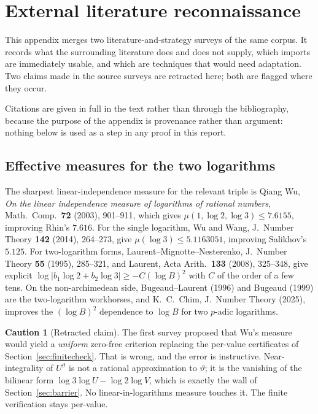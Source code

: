 \documentclass[11pt,oneside]{article}
\theoremstyle{definition}
\newtheorem{warning}[theorem]{Caution}
\theoremstyle{remark}
\newcommand{\thetaq}{\vartheta}
\begin{document}
\section{External literature reconnaissance}
\label{app:literature}

This appendix merges two literature-and-strategy surveys of the same corpus.  It records what
the surrounding literature does and does not supply, which imports are immediately usable, and
which are techniques that would need adaptation.  Two claims made in the source surveys are
retracted here; both are flagged where they occur.

Citations are given in full in the text rather than through the bibliography, because the
purpose of the appendix is provenance rather than argument: nothing below is used as a step in
any proof in this report.

\subsection{Effective measures for the two logarithms}

The sharpest linear-independence measure for the relevant triple is Qiang Wu, \emph{On the
linear independence measure of logarithms of rational numbers}, Math.\ Comp.\ \textbf{72}
(2003), 901--911, which gives $\mu(1,\log2,\log3)\le7.6155$, improving Rhin's $7.616$.  For the
single logarithm, Wu and Wang, J.\ Number Theory \textbf{142} (2014), 264--273, give
$\mu(\log3)\le5.1163051$, improving Salikhov's $5.125$.  For two-logarithm forms,
Laurent--Mignotte--Nesterenko, J.\ Number Theory \textbf{55} (1995), 285--321, and Laurent,
Acta Arith.\ \textbf{133} (2008), 325--348, give explicit
$\log|b_1\log2+b_2\log3|\ge-C(\log B)^2$ with $C$ of the order of a few tens.  On the
non-archimedean side, Bugeaud--Laurent (1996) and Bugeaud (1999) are the two-logarithm
workhorses, and K.~C.~Chim, J.\ Number Theory (2025), improves the $(\log B)^2$ dependence to
$\log B$ for two $p$-adic logarithms.

\begin{warning}[Retracted claim]
The first survey proposed that Wu's measure would yield a \emph{uniform} zero-free criterion
replacing the per-value certificates of Section~\ref{sec:finitecheck}.  That is wrong, and the
error is instructive.  Near-integrality of $U^{\thetaq}$ is not a rational approximation to
$\thetaq$; it is the vanishing of the bilinear form $\log3\log U-\log2\log V$, which is exactly
the wall of Section~\ref{sec:barrier}.  No linear-in-logarithms measure touches it.  The finite
verification stays per-value.
\end{warning}
\end{document}
